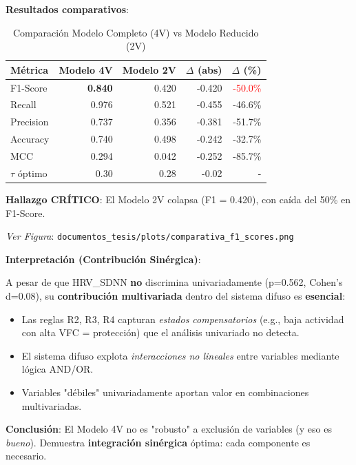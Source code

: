 \documentclass[12pt,letterpaper,twoside]{report}
\begin{document}
\begin{calculobox}
\textbf{Resultados comparativos}:

\begin{table}[H]
\centering
\caption{Comparación Modelo Completo (4V) vs Modelo Reducido (2V)}
\label{tab:robustness_4v_2v}
\begin{tabular}{@{}lrrrr@{}}
\toprule
\textbf{Métrica} & \textbf{Modelo 4V} & \textbf{Modelo 2V} & \textbf{$\Delta$ (abs)} & \textbf{$\Delta$ (\%)} \\
\midrule
F1-Score         & \textbf{0.840} & 0.420 & -0.420 & \textcolor{red}{-50.0\%} \\
Recall           & 0.976          & 0.521 & -0.455 & -46.6\% \\
Precision        & 0.737          & 0.356 & -0.381 & -51.7\% \\
Accuracy         & 0.740          & 0.498 & -0.242 & -32.7\% \\
MCC              & 0.294          & 0.042 & -0.252 & -85.7\% \\
$\tau$ óptimo    & 0.30           & 0.28  & -0.02  & - \\
\bottomrule
\end{tabular}
\end{table}

\textbf{Hallazgo CRÍTICO}: El Modelo 2V colapsa (F1 = 0.420), con caída del 50\% en F1-Score.
\end{calculobox}

\textit{Ver Figura}: \texttt{documentos\_tesis/plots/comparativa\_f1\_scores.png}

\begin{decisionbox}
\textbf{Interpretación (Contribución Sinérgica)}:

A pesar de que HRV\_SDNN \textbf{no} discrimina univariadamente (p=0.562, Cohen's d=0.08), su \textbf{contribución multivariada} dentro del sistema difuso es \textbf{esencial}:

\begin{itemize}[noitemsep]
    \item Las reglas R2, R3, R4 capturan \textit{estados compensatorios} (e.g., baja actividad con alta VFC = protección) que el análisis univariado no detecta.
    \item El sistema difuso explota \textit{interacciones no lineales} entre variables mediante lógica AND/OR.
    \item Variables "débiles" univariadamente aportan valor en combinaciones multivariadas.
\end{itemize}

\textbf{Conclusión}: El Modelo 4V no es "robusto" a exclusión de variables (y eso es \textit{bueno}). Demuestra \textbf{integración sinérgica} óptima: cada componente es necesario.
\end{decisionbox}
\end{document}
